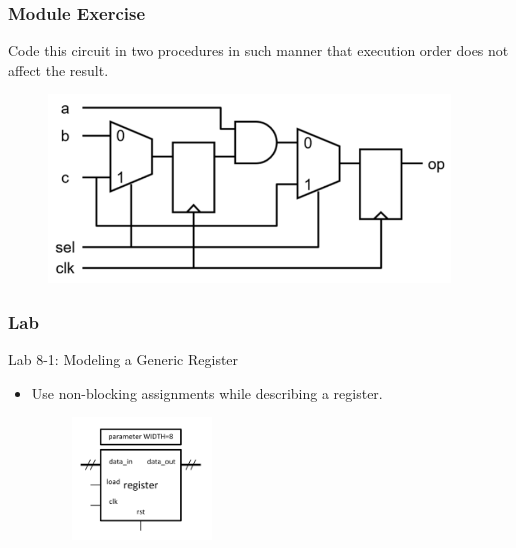 \documentclass[t, notes, xcolor=table]{beamer}
\begin{document}
\begin{frame}
\frametitle{Module Exercise}
Code this circuit in two procedures in such manner that execution order does not affect the result.
\begin{figure}
    \includegraphics[width=0.95\textwidth]{img/07_exe.png}
\end{figure}
\end{frame}

\begin{frame}
\frametitle{Lab}
Lab 8-1: Modeling a Generic Register
\begin{itemize}
\item Use non-blocking assignments while describing a register.
\begin{figure}
    \includegraphics[width=0.35\textwidth]{img/07_lab.png}
\end{figure}
\end{itemize}
\end{frame}
\end{document}
